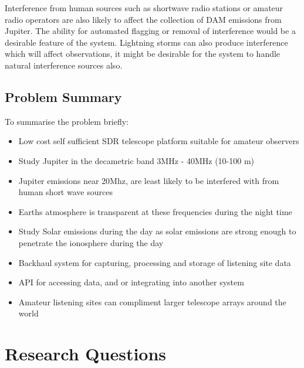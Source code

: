 \documentclass[runningheads,a4paper]{llncs}
\begin{document}
Interference from human sources such as shortwave radio stations or amateur radio operators are also likely to affect the collection of \gls{DAM} emissions from Jupiter. The ability for automated flagging or removal of interference would be a desirable feature of the system. Lightning storms can also produce interference which will affect observations, it might be desirable for the system to handle natural interference sources also.


\subsection*{Problem Summary}

To summarise the problem briefly:

\begin{itemize}
  \item Low cost self sufficient SDR telescope platform suitable for amateur observers
  \item Study Jupiter in the decametric band 3MHz - 40MHz (10-100 m)
  \item Jupiter emissions near 20Mhz, are least likely to be interfered with from human short wave sources
  \item Earths atmosphere is transparent at these frequencies during the night time
  \item Study Solar emissions during the day as solar emissions are strong enough to penetrate the ionosphere during the day
  \item Backhaul system for capturing, processing and storage of listening site data
  \item API for accessing data, and or integrating into another system
  \item Amateur listening sites can compliment larger telescope arrays around the world
\end{itemize}


%
%
\newpage
\section*{Research Questions}
\end{document}
